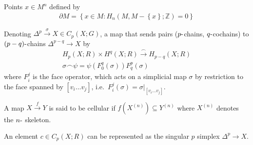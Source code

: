 \begin{definition}[Boundary]

\end{definition}


\begin{definition}

Points \(x\in M^n\) defined by
\begin{align*}
{\partial}M = \left\{{x\in M: H_{n}(M, M-\left\{{x}\right\}; {\mathbb{Z}}) = 0}\right\}
\end{align*}

\end{definition}

\begin{definition}

Denoting \(\Delta^p \xrightarrow{\sigma} X \in C_{p}(X; G)\), a map that
sends pairs (\(p{\hbox{-}}\)chains, \(q{\hbox{-}}\)cochains) to
\((p-q){\hbox{-}}\)chains \(\Delta^{p-q} \to X\) by
\begin{align*}
H_{p}(X; R)\times H^q(X; R) \xrightarrow{\frown} H_{p-q}(X; R)\\
\sigma \frown \psi = \psi(F_{0}^q(\sigma))F_{q}^p(\sigma)
\end{align*}
where \(F_{i}^j\) is the face operator, which acts on a simplicial map
\(\sigma\) by restriction to the face spanned by
\([v_{i} \ldots v_{j}]\),
i.e.~\(F_{i}^j(\sigma) = {\left.{{\sigma}} \right|_{{[v_{i} \ldots v_{j}]}} }\).

\end{definition}

\begin{definition}

\end{definition}


\begin{definition}

A map \(X \xrightarrow{f} Y\) is said to be cellular if
\(f(X^{(n)}) \subseteq Y^{(n)}\) where \(X^{(n)}\) denotes the
\(n{\hbox{-}}\) skeleton.

\end{definition}

\begin{definition}[Chain]

An element \(c \in C_{p}(X; R)\) can be represented as the singular
\(p\) simplex \(\Delta^p \to X\).

\end{definition}


